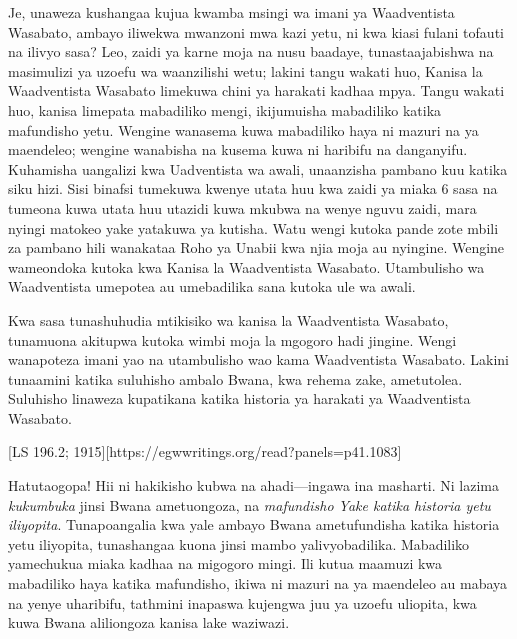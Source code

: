 Je, unaweza kushangaa kujua kwamba msingi wa imani ya Waadventista Wasabato, ambayo iliwekwa mwanzoni mwa kazi yetu, ni kwa kiasi fulani tofauti na ilivyo sasa? Leo, zaidi ya karne moja na nusu baadaye, tunastaajabishwa na masimulizi ya uzoefu wa waanzilishi wetu; lakini tangu wakati huo, Kanisa la Waadventista Wasabato limekuwa chini ya harakati kadhaa mpya. Tangu wakati huo, kanisa limepata mabadiliko mengi, ikijumuisha mabadiliko katika mafundisho yetu. Wengine wanasema kuwa mabadiliko haya ni mazuri na ya maendeleo; wengine wanabisha na kusema kuwa ni haribifu na danganyifu. Kuhamisha uangalizi kwa Uadventista wa awali, unaanzisha pambano kuu katika siku hizi. Sisi binafsi tumekuwa kwenye utata huu kwa zaidi ya miaka 6 sasa na tumeona kuwa utata huu utazidi kuwa mkubwa na wenye nguvu zaidi, mara nyingi matokeo yake yatakuwa ya kutisha. Watu wengi kutoka pande zote mbili za pambano hili wanakataa Roho ya Unabii kwa njia moja au nyingine. Wengine wameondoka kutoka kwa Kanisa la Waadventista Wasabato. Utambulisho wa Waadventista umepotea au umebadilika sana kutoka ule wa awali.


Kwa sasa tunashuhudia mtikisiko wa kanisa la Waadventista Wasabato, tunamuona akitupwa kutoka wimbi moja la mgogoro hadi jingine. Wengi wanapoteza imani yao na utambulisho wao kama Waadventista Wasabato. Lakini tunaamini katika suluhisho ambalo Bwana, kwa rehema zake, ametutolea. Suluhisho linaweza kupatikana katika historia ya harakati ya Waadventista Wasabato.


[LS 196.2; 1915][https://egwwritings.org/read?panels=p41.1083]


Hatutaogopa! Hii ni hakikisho kubwa na ahadi—ingawa ina masharti. Ni lazima \textit{kukumbuka} jinsi Bwana ametuongoza, na \textit{mafundisho Yake katika historia yetu iliyopita}. Tunapoangalia kwa yale ambayo Bwana ametufundisha katika historia yetu iliyopita, tunashangaa kuona jinsi mambo yalivyobadilika. Mabadiliko yamechukua miaka kadhaa na migogoro mingi. Ili kutua maamuzi kwa mabadiliko haya katika mafundisho, ikiwa ni mazuri na ya maendeleo au mabaya na yenye uharibifu, tathmini inapaswa kujengwa juu ya uzoefu uliopita, kwa kuwa Bwana aliliongoza kanisa lake waziwazi.


